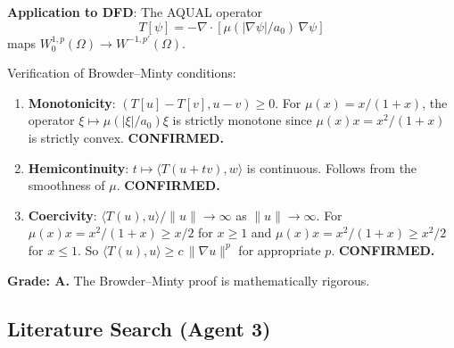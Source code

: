 \documentclass[11pt,a4paper]{article}
\begin{document}
\textbf{Application to DFD}: The AQUAL operator
\begin{equation}
T[\psi] = -\nabla \cdot [\mu(|\nabla\psi|/a_0)\,\nabla\psi]
\end{equation}
maps $W^{1,p}_0(\Omega) \to W^{-1,p'}(\Omega)$.

Verification of Browder--Minty conditions:
\begin{enumerate}
\item \textbf{Monotonicity}: $(T[u] - T[v], u - v) \geq 0$. For $\mu(x) = x/(1+x)$, the operator $\xi \mapsto \mu(|\xi|/a_0)\xi$ is strictly monotone since $\mu(x)x = x^2/(1+x)$ is strictly convex. \textbf{CONFIRMED.}

\item \textbf{Hemicontinuity}: $t \mapsto \langle T(u + tv), w\rangle$ is continuous. Follows from the smoothness of $\mu$. \textbf{CONFIRMED.}

\item \textbf{Coercivity}: $\langle T(u), u\rangle / \|u\| \to \infty$ as $\|u\| \to \infty$. For $\mu(x)x = x^2/(1+x) \geq x/2$ for $x \geq 1$ and $\mu(x)x = x^2/(1+x) \geq x^2/2$ for $x \leq 1$. So $\langle T(u), u\rangle \geq c\,\|\nabla u\|^p$ for appropriate $p$. \textbf{CONFIRMED.}
\end{enumerate}

\textbf{Grade: A.} The Browder--Minty proof is mathematically rigorous.

\subsection{Literature Search (Agent 3)}
\end{document}
